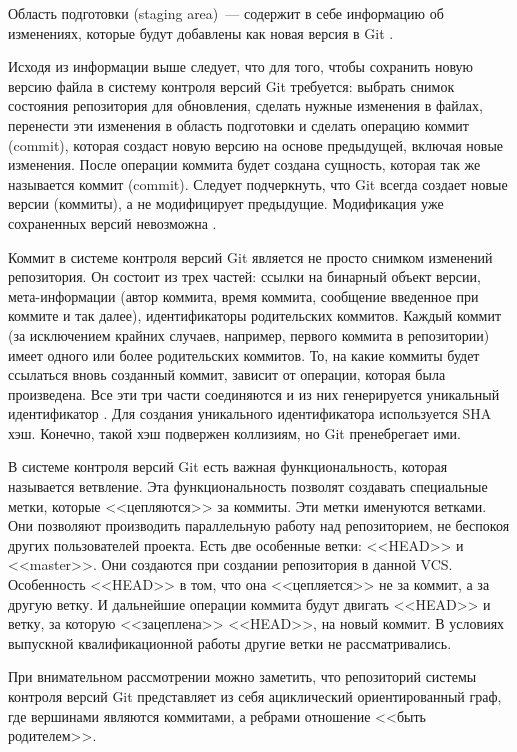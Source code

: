Область подготовки (staging area)~--- содержит в себе информацию об изменениях, которые будут добавлены как новая версия в Git \cite{pro-git}. 

Исходя из информации выше следует, что для того, чтобы сохранить новую версию файла в систему контроля версий Git требуется: выбрать снимок состояния репозитория для обновления, сделать нужные изменения в файлах, перенести эти изменения в область подготовки и сделать операцию коммит (commit), которая создаст новую версию на основе предыдущей, включая новые изменения. После операции коммита будет создана сущность, которая так же называется коммит (commit). Следует подчеркнуть, что Git всегда создает новые версии (коммиты), а не модифицирует предыдущие. Модификация уже сохраненных версий невозможна \cite{pro-git}.

Коммит в системе контроля версий Git является не просто снимком изменений репозитория. Он состоит из трех частей: ссылки на бинарный объект версии, мета-информации (автор коммита, время коммита, сообщение введенное при коммите и так далее), идентификаторы родительских коммитов. Каждый коммит (за исключением крайних случаев, например, первого коммита в репозитории) имеет одного или более родительских коммитов. То, на какие коммиты будет ссылаться вновь созданный коммит, зависит от операции, которая была произведена. Все эти три части соединяются и из них генерируется уникальный идентификатор \cite{pro-git}. Для создания уникального идентификатора используется SHA хэш. Конечно, такой хэш подвержен коллизиям, но Git пренебрегает ими.

В системе контроля версий Git есть важная функциональность, которая называется ветвление. Эта функциональность позволят создавать специальные метки, которые <<цепляются>> за коммиты. Эти метки именуются ветками. Они позволяют производить параллельную работу над репозиторием, не беспокоя других пользователей проекта. Есть две особенные ветки: <<HEAD>> и <<master>>. Они создаются при создании репозитория в данной VCS. Особенность <<HEAD>> в том, что она <<цепляется>> не за коммит, а за другую ветку. И дальнейшие операции коммита будут двигать <<HEAD>> и ветку, за которую <<зацеплена>> <<HEAD>>, на новый коммит. В условиях выпускной квалификационной работы другие ветки не рассматривались.

При внимательном рассмотрении можно заметить, что репозиторий системы контроля версий Git представляет из себя ациклический ориентированный граф, где вершинами являются коммитами, а ребрами отношение <<быть родителем>>.
